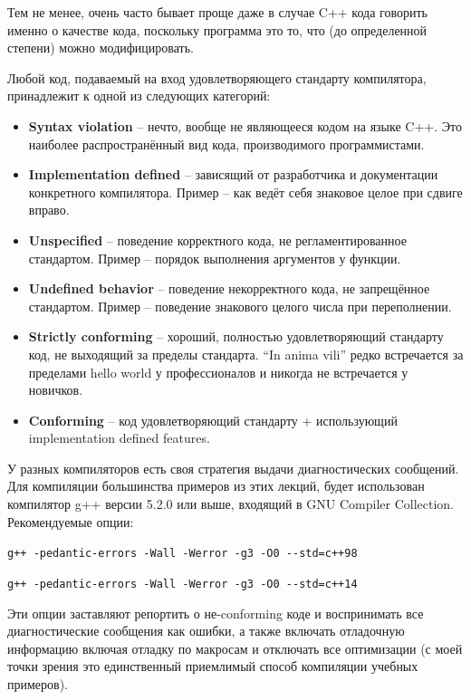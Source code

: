\documentclass[a4paper,12pt,oneside]{article}
\begin{document}
Тем не менее, очень часто бывает проще даже в случае C++ кода говорить именно о качестве кода, поскольку программа это то, что (до определенной степени) можно модифицировать.

Любой код, подаваемый на вход удовлетворяющего стандарту компилятора, принадлежит к одной из следующих категорий:

\begin{itemize}
\item
 \textbf{Syntax violation} -- нечто, вообще не являющееся кодом на языке C++. Это наиболее распространённый вид кода, производимого программистами.
\item
 \textbf{Implementation defined} – зависящий от разработчика и документации конкретного компилятора. Пример – как ведёт себя знаковое целое при сдвиге вправо.
\item
 \textbf{Unspecified} – поведение корректного кода, не регламентированное стандартом. 
 Пример – порядок выполнения аргументов у функции.
\item
 \textbf{Undefined behavior} – поведение некорректного кода, не запрещённое стандартом. 
 Пример – поведение знакового целого числа при переполнении.
\item
 \textbf{Strictly conforming} – хороший, полностью удовлетворяющий стандарту код, не выходящий за пределы стандарта. ``In anima vili'' редко встречается за пределами hello world у профессионалов и никогда не встречается у новичков.
\item
 \textbf{Conforming} – код удовлетворяющий стандарту + использующий implementation defined features.
\end{itemize}

У разных компиляторов есть своя стратегия выдачи диагностических сообщений. Для компиляции большинства примеров из этих лекций, будет использован компилятор g++ версии 5.2.0 или выше, входящий в GNU Compiler Collection. Рекомендуемые опции: 

\lstinline!g++ -pedantic-errors -Wall -Werror -g3 -O0 --std=c++98!

\lstinline!g++ -pedantic-errors -Wall -Werror -g3 -O0 --std=c++14!

Эти опции заставляют репортить о не-conforming коде и воспринимать все диагностические сообщения как ошибки, а также включать отладочную информацию включая отладку по макросам и отключать все оптимизации (с моей точки зрения это единственный приемлимый способ компиляции учебных примеров).
\end{document}
